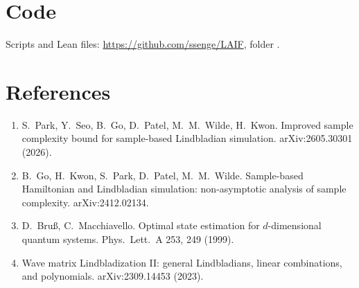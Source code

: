 \documentclass[11pt]{article}
\theoremstyle{remark}
\begin{document}
\section*{Code}
Scripts and Lean files: \url{https://github.com/ssenge/LAIF}, folder .

\section*{References}
\begin{enumerate}
\item[{[1]}] S.~Park, Y.~Seo, B.~Go, D.~Patel, M.~M.~Wilde, H.~Kwon. Improved sample complexity bound for sample-based Lindbladian simulation. arXiv:2605.30301 (2026).
\item[{[2]}] B.~Go, H.~Kwon, S.~Park, D.~Patel, M.~M.~Wilde. Sample-based Hamiltonian and Lindbladian simulation: non-asymptotic analysis of sample complexity. arXiv:2412.02134.
\item[{[3]}] D.~Bru{\ss}, C.~Macchiavello. Optimal state estimation for $d$-dimensional quantum systems. Phys.\ Lett.\ A 253, 249 (1999).
\item[{[4]}] Wave matrix Lindbladization II: general Lindbladians, linear combinations, and polynomials. arXiv:2309.14453 (2023).
\end{enumerate}
\end{document}
